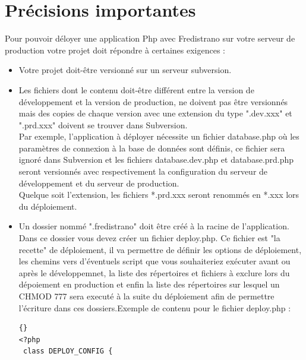 \documentclass[12pt,a4paper]{report}
\begin{document}
\section{Précisions importantes}\label{precimportantes}
Pour pouvoir déloyer une application Php avec Fredistrano sur votre serveur de production votre projet doit répondre à certaines exigences :\\
\begin{itemize}
\item Votre projet doit-être versionné sur un serveur subversion.\\
\item Les fichiers dont le contenu doit-\^{e}tre différent entre la version de développement et la version de production, ne doivent pas être versionnés mais des copies de chaque version avec une extension du type ".dev.xxx" et ".prd.xxx" doivent se trouver dans Subversion.\\
Par exemple, l'application à déployer nécessite un fichier database.php où les paramètres de connexion à la base de données sont définis, ce fichier sera ignoré dans Subversion et les fichiers database.dev.php et database.prd.php seront versionnés avec respectivement la configuration du serveur de développement et du serveur de production.\\
Quelque soit l'extension, les fichiers *.prd.xxx seront renommés en *.xxx lors du déploiement.\\
\item Un dossier nommé ".fredistrano" doit \^{e}tre créé à la racine de l'application. Dans ce dossier vous devez créer un fichier deploy.php. Ce fichier est "la recette" de déploiement, il va permettre de définir les options de déploiement, les chemins vers d'éventuels script que vous souhaiteriez exécuter avant ou après le développemnet, la liste des répertoires et fichiers à exclure lors du dépoiement en production et enfin la liste des répertoires sur lesquel un CHMOD 777 sera executé à la suite du déploiement afin de permettre l'écriture dans ces dossiers.\newpage Exemple de contenu pour le fichier deploy.php :\\

\lstset{language=Php}
\lstset{breaklines=true}
\lstset{tabsize=2}
\lstset{commentstyle=\textit}
\begin{lstlisting}[frame=tb]{}
<?php
 class DEPLOY_CONFIG {
	

\end{lstlisting}
\end{itemize}
\end{document}
